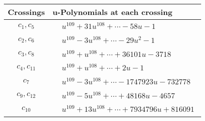 \documentclass[1p]{elsarticle_modified}
\theoremstyle{definition}
\begin{document}
\begin{tabular}{m{50pt}|m{274pt}}
Crossings & \hspace{64pt}u-Polynomials at each crossing \\
\hline $$\begin{aligned}c_{1},c_{5}\end{aligned}$$&$\begin{aligned}
&u^{109}+31 u^{108}+\cdots-58 u-1
\end{aligned}$\\
\hline $$\begin{aligned}c_{2},c_{6}\end{aligned}$$&$\begin{aligned}
&u^{109}-3 u^{108}+\cdots-29 u^2-1
\end{aligned}$\\
\hline $$\begin{aligned}c_{3},c_{8}\end{aligned}$$&$\begin{aligned}
&u^{109}+u^{108}+\cdots+36101 u-3718
\end{aligned}$\\
\hline $$\begin{aligned}c_{4},c_{11}\end{aligned}$$&$\begin{aligned}
&u^{109}+u^{108}+\cdots+2 u-1
\end{aligned}$\\
\hline $$\begin{aligned}c_{7}\end{aligned}$$&$\begin{aligned}
&u^{109}-3 u^{108}+\cdots-1747923 u-732778
\end{aligned}$\\
\hline $$\begin{aligned}c_{9},c_{12}\end{aligned}$$&$\begin{aligned}
&u^{109}-5 u^{108}+\cdots+48168 u-4657
\end{aligned}$\\
\hline $$\begin{aligned}c_{10}\end{aligned}$$&$\begin{aligned}
&u^{109}+13 u^{108}+\cdots+7934796 u+816091
\end{aligned}$\\
\hline
\end{tabular}\\~\\
\end{document}
